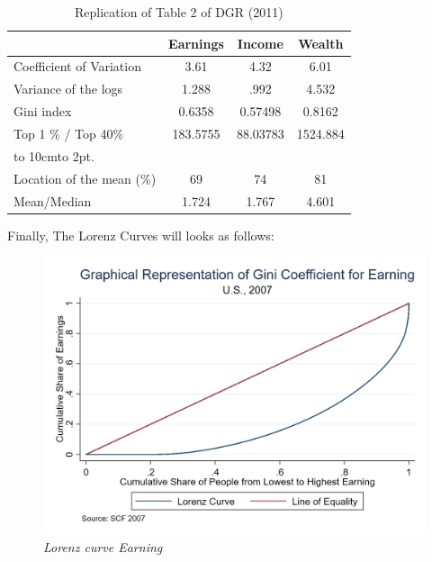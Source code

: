 \documentclass[12pt]{article}%
\def\dotfill#1{\cleaders\hbox to #1{.}\hfill}
\newcommand\dotline[2][.5em]{\leavevmode\hbox to #2{\dotfill{#1}\hfil}}
\begin{document}
\begin{enumerate}
	\begin {table}[H]
\footnotesize
\begin{center}
	\caption {Replication of Table 2 of DGR (2011)}
	\label{tab:Table2}
	{
		\begin{tabular}{l*{3}{c}}
			\hline
			&  Earnings&Income&Wealth\\
			\hline
			Coefficient of Variation &  3.61 &   4.32 &  6.01\\
			Variance of the logs  &1.288 & .992 &4.532	 \\
			Gini index & 0.6358&0.57498&0.8162\\
			Top 1 \% /  Top 40\%&183.5755 &88.03783&1524.884 \\
			\multicolumn{4}{l}{\dotline[2pt]{10cm}} \\
			Location of the mean (\%) &69&74&81\\
			Mean/Median & 1.724 &	1.767 & 4.601\\
			\hline
		\end{tabular}
	}	
	
\end{center} 
\end {table}
	
	\vspace{3mm}
	
	
	Finally, The Lorenz Curves will looks as follows:
	
	
		
	\begin{figure}[H]
		\begin{center}
			\includegraphics[width=0.7\linewidth]{build_data/output/Lorenz_earning}
		\end{center}	
		\caption{\small \sl Lorenz curve Earning} 
		\label{fig:Fig1}
	\end{figure}
	

\end{enumerate}
\end{document}
